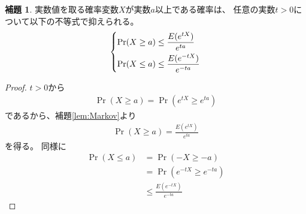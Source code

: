 \documentclass[a4paper, 10pt]{jsarticle}
\theoremstyle{definition}
\newtheorem{lem}[thm]{補題}
\begin{document}
\begin{screen}
\begin{lem}\label{lem:Chernoff1}
	実数値を取る確率変数$X$が実数$a$以上である確率は、
	任意の実数$t > 0$について以下の不等式で抑えられる。
	\begin{align}
		\begin{dcases}
			\Pr (X \ge a) \le \frac{E(e^{tX})}{e^{ta}} \\
			\Pr (X \le a) \le \frac{E(e^{-tX})}{e^{-ta}}
		\end{dcases}
	\end{align}
\end{lem}
\end{screen}
\begin{proof}
	$t > 0$から
	\begin{align}
		\Pr (X \ge a) = \Pr \left( e^{tX} \ge e^{ta} \right)
	\end{align}
	であるから、補題\ref{lem:Markov}より
	\begin{align}
		\Pr (X \ge a) = \frac{E(e^{tX})}{e^{ta}}
	\end{align}
	を得る。
	同様に
	\begin{align}
		\Pr (X \le a) &= \Pr (-X \ge -a) \\
		&= \Pr \left(e^{-tX} \ge e^{-ta} \right) \\
		&\le \frac{E(e^{-tX})}{e^{-ta}}
	\end{align}
\end{proof}
\end{document}
